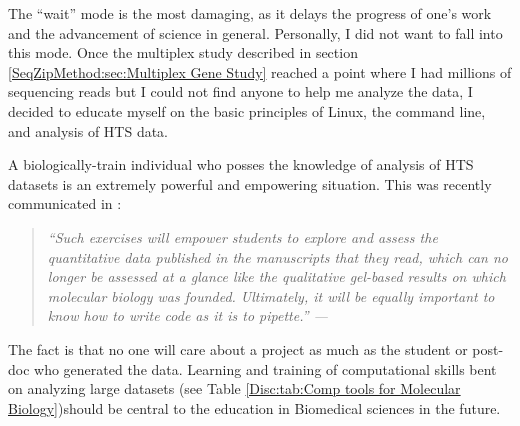     The ``wait'' mode is the most damaging, as it delays the progress of one's work and the advancement of science in general. Personally, I did not want to fall into this mode. Once the multiplex study described in section \ref{SeqZipMethod:sec:Multiplex Gene Study} reached a point where I had millions of sequencing reads but I could not find anyone to help me analyze the data, I decided to educate myself on the basic principles of Linux, the command line, and analysis of HTS data.

    A biologically-train individual who posses the knowledge of analysis of HTS datasets is an extremely powerful and empowering situation. This was recently communicated in \citet{Plocik2013}:

    \begin{quote} %
      \itshape 
      ``Such exercises will empower students to explore and assess the quantitative data published in the manuscripts that they read, which can no longer be assessed at a glance like the qualitative gel-based results on which molecular biology was founded. Ultimately, it will be equally important to know how to write code as it is to pipette.'' --- \citep{Plocik2013}
      \singlespacing
      \end{quote}

    The fact is that no one will care about a project as much as the student or post-doc who generated the data. Learning and training of computational skills bent on analyzing large datasets (see Table \ref{Disc:tab:Comp tools for Molecular Biology})should be central to the education in Biomedical sciences in the future.

\cleardoublepage